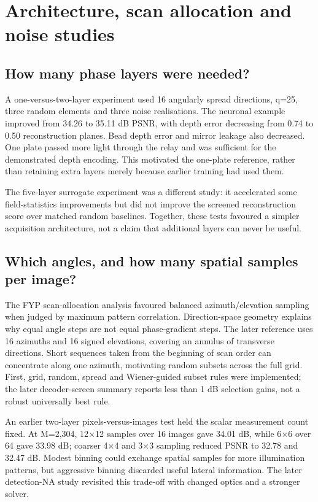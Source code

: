 \section{Architecture, scan allocation and noise studies}

\subsection{How many phase layers were needed?}

A one-versus-two-layer experiment used 16 angularly spread directions, q=25, three random elements and three noise realisations. The neuronal example improved from 34.26 to 35.11 dB PSNR, with depth error decreasing from 0.74 to 0.50 reconstruction planes. Bead depth error and mirror leakage also decreased. One plate passed more light through the relay and was sufficient for the demonstrated depth encoding. This motivated the one-plate reference, rather than retaining extra layers merely because earlier training had used them.

The five-layer surrogate experiment was a different study: it accelerated some field-statistics improvements but did not improve the screened reconstruction score over matched random baselines. Together, these tests favoured a simpler acquisition architecture, not a claim that additional layers can never be useful.

\subsection{Which angles, and how many spatial samples per image?}

The FYP scan-allocation analysis favoured balanced azimuth/elevation sampling when judged by maximum pattern correlation. Direction-space geometry explains why equal angle steps are not equal phase-gradient steps. The later reference uses 16 azimuths and 16 signed elevations, covering an annulus of transverse directions. Short sequences taken from the beginning of scan order can concentrate along one azimuth, motivating random subsets across the full grid. First, grid, random, spread and Wiener-guided subset rules were implemented; the later decoder-screen summary reports less than 1 dB selection gains, not a robust universally best rule.

An earlier two-layer pixels-versus-images test held the scalar measurement count fixed. At M=2,304, 12\ensuremath{\times}12 samples over 16 images gave 34.01 dB, while 6\ensuremath{\times}6 over 64 gave 33.98 dB; coarser 4\ensuremath{\times}4 and 3\ensuremath{\times}3 sampling reduced PSNR to 32.78 and 32.47 dB. Modest binning could exchange spatial samples for more illumination patterns, but aggressive binning discarded useful lateral information. The later detection-NA study revisited this trade-off with changed optics and a stronger solver.

